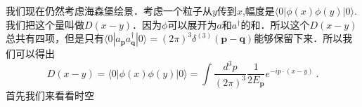 
我们现在仍然考虑海森堡绘景．考虑一个粒子从$y$传到$x$,幅度是$\langle 0 |\phi(x)\phi(y)| 0 \rangle$.我们把这个量叫做$D(x-y)$．因为$\phi$可以展开为$a$和$a^\dagger$的和．所以这个$D(x-y)$总共有四项，但是只有$\langle 0 | a_{\mathbf p} a^\dagger_{\mathbf q} | 0 \rangle = (2\pi)^3 \delta^{(3)}(\mathbf p - \mathbf q)$能够保留下来．所以我们可以得出
\begin{equation}
D(x-y)=\langle 0|\phi(x) \phi(y)| 0\rangle=\int \frac{d^{3} p}{(2 \pi)^{3}} \frac{1}{2 E_{\mathbf{p}}} e^{-i p \cdot(x-y)}~.
\end{equation}
首先我们来看看时空


